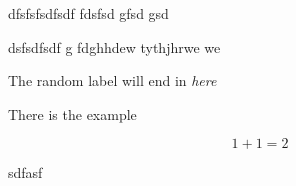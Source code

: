 \documentclass[a4,12pt,onecoloumn]{article}
\begin{document}
dfsfsfsdfsdf fdsfsd gfsd gsd

dsfsdfsdf g fdghhdew tythjhrwe we

The random label will end in \emph{here }


\label{random}

There is the example 

\begin{equation}
  \label{exam}
  1+1 =2
\end{equation}

sdfasf
\end{document}
